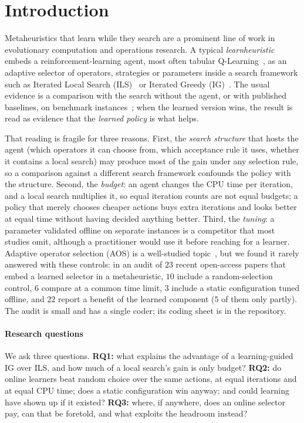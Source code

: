 \section{Introduction}
\label{sec:intro}
Metaheuristics that learn while they search are a prominent line of work in evolutionary computation and operations research. A typical \emph{learnheuristic}~\cite{CalvetEtal2017} embeds a reinforcement-learning agent, most often tabular Q-Learning~\cite{WatkinsDayan1992,SuttonBarto2018}, as an adaptive selector of operators, strategies or parameters inside a search framework such as Iterated Local Search (ILS)~\cite{LourencaoEtal2019} or Iterated Greedy (IG)~\cite{RuizStutzle2007}. The usual evidence is a comparison with the search without the agent, or with published baselines, on benchmark instances~\cite{KarimiMamaghanEtal2023,MissaouiOSullivan2026}; when the learned version wins, the result is read as evidence that the \emph{learned policy} is what helps.

That reading is fragile for three reasons. First, the \emph{search structure} that hosts the agent (which operators it can choose from, which acceptance rule it uses, whether it contains a local search) may produce most of the gain under any selection rule, so a comparison against a different search framework confounds the policy with the structure. Second, the \emph{budget}: an agent changes the CPU time per iteration, and a local search multiplies it, so equal iteration counts are not equal budgets; a policy that merely chooses cheaper actions buys extra iterations and looks better at equal time without having decided anything better. Third, the \emph{tuning}: a parameter validated offline on separate instances is a competitor that most studies omit, although a practitioner would use it before reaching for a learner. Adaptive operator selection (AOS) is a well-studied topic~\cite{FialhoEtal2010,PisingerRopke2007}, but we found it rarely answered with these controls: in an audit of $23$ recent open-access papers that embed a learned selector in a metaheuristic, $10$ include a random-selection control, $6$ compare at a common time limit, $3$ include a static configuration tuned offline, and $22$ report a benefit of the learned component ($5$ of them only partly). The audit is small and has a single coder; its coding sheet is in the repository.

\paragraph{Research questions} We ask three questions.
\textbf{RQ1:} what explains the advantage of a learning-guided IG over ILS, and how much of a local search's gain is only budget?
\textbf{RQ2:} do online learners beat random choice over the same actions, at equal iterations and at equal CPU time; does a static configuration win anyway; and could learning have shown up if it existed?
\textbf{RQ3:} where, if anywhere, does an online selector pay, can that be foretold, and what exploits the headroom instead?

